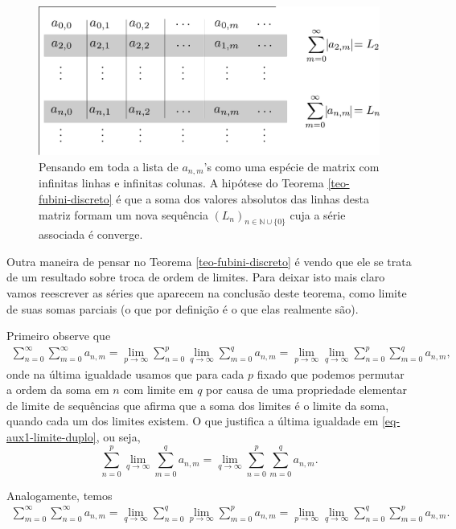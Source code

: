 \begin{figure}[h]
\centering
\includegraphics[width=0.75\linewidth]{Figuras/fubini-anm}
\caption{Pensando em toda a lista de $a_{n,m}$'s como uma espécie de matrix com infinitas linhas e infinitas colunas. A hipótese do Teorema \ref{teo-fubini-discreto} é que a soma dos valores absolutos das linhas desta matriz formam um nova sequência $(L_n)_{n\in\mathbb{N}\cup\{0\}}$ cuja a série associada é converge.}
\label{fig:fubini-anm}
\end{figure}


Outra maneira de pensar no Teorema \ref{teo-fubini-discreto} é vendo
que ele se trata de um resultado sobre troca de ordem de limites.
Para deixar isto mais claro vamos reescrever as séries
que aparecem na conclusão deste teorema, como limite de suas somas parciais 
(o que por definição é o que elas realmente são). 


Primeiro observe que
\begin{align}\label{eq-aux1-limite-duplo}
\sum_{n=0}^{\infty}\sum_{m=0}^{\infty}a_{n,m}
=
\lim_{p\to\infty}\sum_{n=0}^{p}\lim_{q\to\infty} \sum_{m=0}^{q}a_{n,m} 
=
\lim_{p\to\infty} \lim_{q\to\infty} \sum_{n=0}^{p} \sum_{m=0}^{q}a_{n,m}, 
\end{align}
onde na última igualdade usamos que para cada $p$ fixado que podemos
permutar a ordem da soma em $n$ com limite em $q$ por causa de uma propriedade
elementar de limite de sequências que afirma que a soma 
dos limites é o limite da soma,
quando cada um dos limites existem. O que justifica a última 
igualdade em \eqref{eq-aux1-limite-duplo}, ou seja,
\[
\sum_{n=0}^{p}\lim_{q\to\infty} \sum_{m=0}^{q}a_{n,m} 
=
\lim_{q\to\infty} \sum_{n=0}^{p}\sum_{m=0}^{q}a_{n,m}. 
\]
\bigskip 


Analogamente, temos 
\begin{align}\label{eq-aux2-limite-duplo}
\sum_{m=0}^{\infty}\sum_{n=0}^{\infty}a_{n,m}
=
\lim_{q\to\infty}\sum_{n=0}^{q}\lim_{p\to\infty} \sum_{m=0}^{p}a_{n,m} 
=
\lim_{p\to\infty} \lim_{q\to\infty} \sum_{n=0}^{q} \sum_{m=0}^{p}a_{n,m}. 
\end{align}


